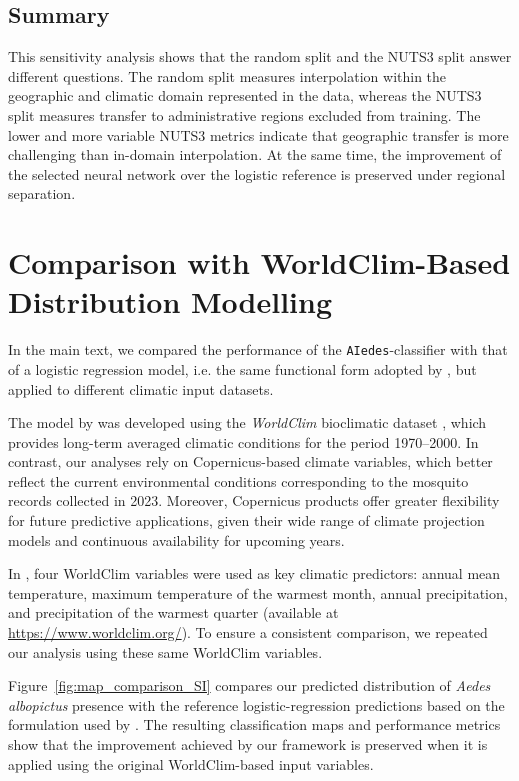 \documentclass[11pt,a4paper]{article}
\begin{document}
\subsection{Summary}

This sensitivity analysis shows that the random split and the NUTS3 split answer different questions. The random split measures interpolation within the geographic and climatic domain represented in the data, whereas the NUTS3 split measures transfer to administrative regions excluded from training. The lower and more variable NUTS3 metrics indicate that geographic transfer is more challenging than in-domain interpolation. At the same time, the improvement of the selected neural network over the logistic reference is preserved under regional separation.


\section{Comparison with WorldClim-Based Distribution Modelling}

In the main text, we compared the performance of the \texttt{AIedes}-classifier with that of a logistic regression model, i.e. the same functional form adopted by \cite{zardini2024}, but applied to different climatic input datasets.

The model by \cite{zardini2024} was developed using the \textit{WorldClim} bioclimatic dataset \cite{worldclim_2023}, which provides long-term averaged climatic conditions for the period 1970--2000. In contrast, our analyses rely on Copernicus-based climate variables, which better reflect the current environmental conditions corresponding to the mosquito records collected in 2023. Moreover, Copernicus products offer greater flexibility for future predictive applications, given their wide range of climate projection models and continuous availability for upcoming years.

In \cite{zardini2024}, four WorldClim variables were used as key climatic predictors: annual mean temperature, maximum temperature of the warmest month, annual precipitation, and precipitation of the warmest quarter (available at \url{https://www.worldclim.org/}). To ensure a consistent comparison, we repeated our analysis using these same WorldClim variables.

Figure~\ref{fig:map_comparison_SI} compares our predicted distribution of \emph{Aedes albopictus} presence with the reference logistic-regression predictions based on the formulation used by \cite{zardini2024}. The resulting classification maps and performance metrics show that the improvement achieved by our framework is preserved when it is applied using the original WorldClim-based input variables.
\end{document}
